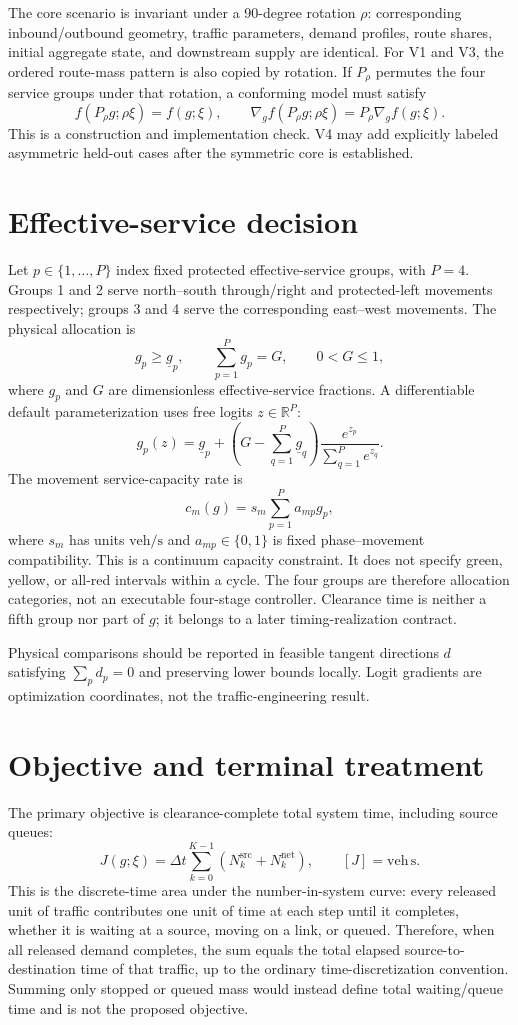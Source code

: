 \documentclass[10pt]{article}
\newcommand{\veh}{\mathrm{veh}}
\newcommand{\secnd}{\mathrm{s}}
\newcommand{\R}{\mathbb{R}}
\begin{document}
The core scenario is invariant under a 90-degree rotation $\rho$: corresponding inbound/outbound geometry, traffic parameters, demand profiles, route shares, initial aggregate state, and downstream supply are identical. For V1 and V3, the ordered route-mass pattern is also copied by rotation. If $P_\rho$ permutes the four service groups under that rotation, a conforming model must satisfy
\[
  f(P_\rho g;\rho\xi)=f(g;\xi),\qquad
  \nabla_g f(P_\rho g;\rho\xi)=P_\rho\nabla_g f(g;\xi).
\]
This is a construction and implementation check. V4 may add explicitly labeled asymmetric held-out cases after the symmetric core is established.

\section{Effective-service decision}
Let $p\in\{1,\ldots,P\}$ index fixed protected effective-service groups, with $P=4$. Groups 1 and 2 serve north--south through/right and protected-left movements respectively; groups 3 and 4 serve the corresponding east--west movements. The physical allocation is
\[
  g_p \ge \underline g_p, \qquad \sum_{p=1}^{P}g_p=G, \qquad 0<G\le 1,
\]
where $g_p$ and $G$ are dimensionless effective-service fractions. A differentiable default parameterization uses free logits $z\in\R^P$:
\[
  g_p(z)=\underline g_p+
  \left(G-\sum_{q=1}^{P}\underline g_q\right)
  \frac{e^{z_p}}{\sum_{q=1}^{P}e^{z_q}}.
\]
The movement service-capacity rate is
\[
  c_m(g)=s_m\sum_{p=1}^{P}a_{mp}g_p,
\]
where $s_m$ has units $\veh/\secnd$ and $a_{mp}\in\{0,1\}$ is fixed phase--movement compatibility. This is a continuum capacity constraint. It does not specify green, yellow, or all-red intervals within a cycle.
The four groups are therefore allocation categories, not an executable four-stage controller. Clearance time is neither a fifth group nor part of $g$; it belongs to a later timing-realization contract.

Physical comparisons should be reported in feasible tangent directions $d$ satisfying $\sum_p d_p=0$ and preserving lower bounds locally. Logit gradients are optimization coordinates, not the traffic-engineering result.

\section{Objective and terminal treatment}
The primary objective is clearance-complete total system time, including source queues:
\[
  J(g;\xi)=\Delta t\sum_{k=0}^{K-1}
  \left(N^{\mathrm{src}}_k + N^{\mathrm{net}}_k\right),
  \qquad [J]=\veh\,\secnd.
\]
This is the discrete-time area under the number-in-system curve: every released unit of traffic contributes one unit of time at each step until it completes, whether it is waiting at a source, moving on a link, or queued. Therefore, when all released demand completes, the sum equals the total elapsed source-to-destination time of that traffic, up to the ordinary time-discretization convention. Summing only stopped or queued mass would instead define total waiting/queue time and is not the proposed objective.
\end{document}
